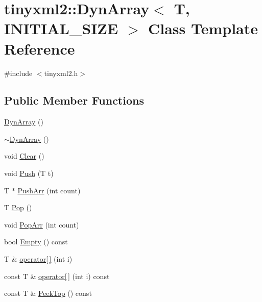 \hypertarget{classtinyxml2_1_1_dyn_array}{}\section{tinyxml2\+:\+:Dyn\+Array$<$ T, I\+N\+I\+T\+I\+A\+L\+\_\+\+S\+I\+ZE $>$ Class Template Reference}
\label{classtinyxml2_1_1_dyn_array}


{\ttfamily \#include $<$tinyxml2.\+h$>$}

\subsection*{Public Member Functions}
\begin{DoxyCompactItemize}
\item 
\mbox{\hyperlink{classtinyxml2_1_1_dyn_array_aaad72f384e761c70a4519183eb8fea17}{Dyn\+Array}} ()
\item 
\mbox{\hyperlink{classtinyxml2_1_1_dyn_array_a4a6aefdca7fe0d3f4068e31870a5adee}{$\sim$\+Dyn\+Array}} ()
\item 
void \mbox{\hyperlink{classtinyxml2_1_1_dyn_array_af87a804cd831226d069274b44b74b8bc}{Clear}} ()
\item 
void \mbox{\hyperlink{classtinyxml2_1_1_dyn_array_aea7ffe983b5d3284bd43171afd7c99d0}{Push}} (T t)
\item 
T $\ast$ \mbox{\hyperlink{classtinyxml2_1_1_dyn_array_ad289abee8cd02b26e215f1b63d2043f1}{Push\+Arr}} (int count)
\item 
T \mbox{\hyperlink{classtinyxml2_1_1_dyn_array_a27a3f2f6f869815b6eabb3ea40cf0712}{Pop}} ()
\item 
void \mbox{\hyperlink{classtinyxml2_1_1_dyn_array_ab8b8c94a2312ab27e2846f0d61ef677a}{Pop\+Arr}} (int count)
\item 
bool \mbox{\hyperlink{classtinyxml2_1_1_dyn_array_a044fc26f44ed3e96ffaeac542188149e}{Empty}} () const
\item 
T \& \mbox{\hyperlink{classtinyxml2_1_1_dyn_array_a756cf4e7464c711aa720e2b17a251daa}{operator\mbox{[}$\,$\mbox{]}}} (int i)
\item 
const T \& \mbox{\hyperlink{classtinyxml2_1_1_dyn_array_a474a5cd9bc97ea32b3dcef4c773125e1}{operator\mbox{[}$\,$\mbox{]}}} (int i) const
\item 
const T \& \mbox{\hyperlink{classtinyxml2_1_1_dyn_array_a5e4e1e408e646688503dec77c77c9d59}{Peek\+Top}} () const
\item 

\end{DoxyCompactItemize}
